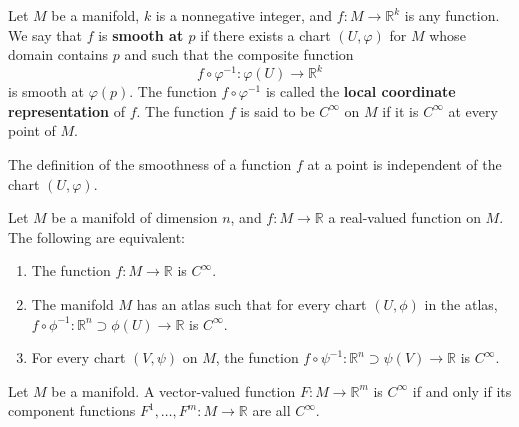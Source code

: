 \documentclass[12pt, oneside]{book}
\begin{document}
\begin{definition}
    Let $M$ be a manifold, $k$ is a nonnegative integer, and $f: M \rightarrow \mathbb{R}^k$ is any function. We say that $f$ is \textbf{smooth at $p$} if there exists a chart $(U, \varphi)$ for $M$ whose domain contains $p$ and such that the composite function
    \begin{equation*}
        f \circ \varphi^{-1} : \varphi(U)\rightarrow
        \mathbb{R}^k
    \end{equation*}
    is smooth at $\varphi(p)$.
    The function $f \circ \varphi^{-1}$ is called the \textbf{local coordinate representation} of $f$.
    The function $f$ is said to be $C^{\infty}$ on $M$ if it is $C^{\infty}$ at every point of $M$.
    \begin{remark}
        The definition of the smoothness of a function $f$ at a point is independent of the chart $(U,\varphi)$.
    \end{remark}
\end{definition}

\begin{proposition}
    Let $M$ be a manifold of dimension $n$, and $f: M \rightarrow \mathbb{R}$ a real-valued function on $M$. The following are equivalent:
    \begin{enumerate}
        \item
              The function $f: M \rightarrow \mathbb{R}$ is $C^{\infty}$.

        \item
              The manifold $M$ has an atlas such that for every chart $\left(U, \phi\right)$ in the atlas, $f \circ \phi^{-1}: \mathbb{R}^n \supset \phi(U) \rightarrow \mathbb{R}$ is $C^{\infty}$.

        \item
              For every chart $(V, \psi)$ on $M$, the function $f \circ \psi^{-1}: \mathbb{R}^n \supset \psi(V) \rightarrow \mathbb{R}$ is $C^{\infty}$.
    \end{enumerate}
\end{proposition}
\begin{proposition}
    Let $M$ be a manifold.
    A vector-valued function $F: M \rightarrow \mathbb{R}^m$ is $C^{\infty}$ if and only if its component functions $F^1, \ldots, F^m: M \rightarrow \mathbb{R}$ are all $C^{\infty}$.
\end{proposition}
\end{document}
